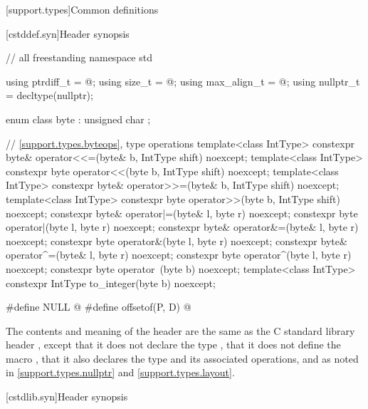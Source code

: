 [support.types]{Common definitions}

[cstddef.syn]{Header  synopsis}

%
%
%
%
%
%
%
\begin{codeblock}
// all freestanding
namespace std {
  using ptrdiff_t = @\seebelow@;
  using size_t = @\seebelow@;
  using max_align_t = @\seebelow@;
  using nullptr_t = decltype(nullptr);

  enum class byte : unsigned char {};

  // \ref{support.types.byteops},  type operations
  template<class IntType>
    constexpr byte& operator<<=(byte& b, IntType shift) noexcept;
  template<class IntType>
    constexpr byte operator<<(byte b, IntType shift) noexcept;
  template<class IntType>
    constexpr byte& operator>>=(byte& b, IntType shift) noexcept;
  template<class IntType>
    constexpr byte operator>>(byte b, IntType shift) noexcept;
  constexpr byte& operator|=(byte& l, byte r) noexcept;
  constexpr byte operator|(byte l, byte r) noexcept;
  constexpr byte& operator&=(byte& l, byte r) noexcept;
  constexpr byte operator&(byte l, byte r) noexcept;
  constexpr byte& operator^=(byte& l, byte r) noexcept;
  constexpr byte operator^(byte l, byte r) noexcept;
  constexpr byte operator~(byte b) noexcept;
  template<class IntType>
    constexpr IntType to_integer(byte b) noexcept;
}

#define NULL @\seebelow@
#define offsetof(P, D) @\seebelow@
\end{codeblock}

\pnum
The contents and meaning of the header  are the same as
the C standard library header ,
except that it does not declare the type ,
that it does not define the macro ,
that it also declares the type 
and its associated operations,
and as noted in
\ref{support.types.nullptr} and
\ref{support.types.layout}.


[cstdlib.syn]{Header  synopsis}

